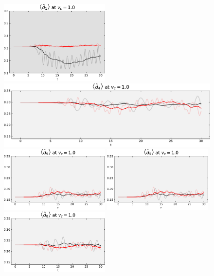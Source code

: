 \begin{figure}[!hbt]
{{\begin{minipage}[b]{.59\textwidth}
                \includegraphics[width=0.49\textwidth]{graph/double_occupation/double_occupation_vc_10_site_1.pdf}
                \includegraphics[width=1.00\textwidth]{graph/double_occupation/double_occupation_vc_10_site_4.pdf}
                \includegraphics[width=0.49\textwidth]{graph/double_occupation/double_occupation_vc_10_site_9.pdf}
                \includegraphics[width=0.49\textwidth]{graph/double_occupation/double_occupation_vc_10_site_5.pdf}
                \includegraphics[width=0.49\textwidth]{graph/double_occupation/double_occupation_vc_10_site_8.pdf}

\end{minipage}}}
\end{figure}
